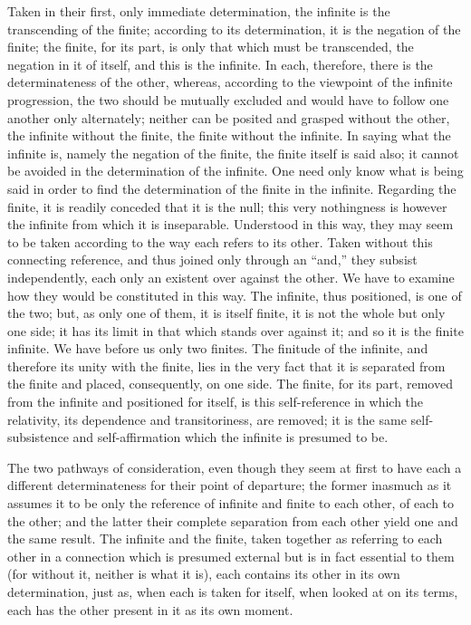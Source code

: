 Taken in their first, only immediate determination,
the infinite is the transcending of the finite;
according to its determination, it is the negation of the finite;
the finite, for its part, is only that which must be transcended,
the negation in it of itself, and this is the infinite.
In each, therefore, there is the determinateness of the other,
whereas, according to the viewpoint of the infinite progression,
the two should be mutually excluded
and would have to follow one another only alternately;
neither can be posited and grasped without the other,
the infinite without the finite, the finite without the infinite.
In saying what the infinite is, namely the negation of the finite,
the finite itself is said also;
it cannot be avoided in the determination of the infinite.
One need only know what is being said in order to
find the determination of the finite in the infinite.
Regarding the finite, it is readily conceded that it is the null;
this very nothingness is however the infinite
from which it is inseparable.
Understood in this way, they may seem to be taken
according to the way each refers to its other.
Taken without this connecting reference,
and thus joined only through an “and,”
they subsist independently,
each only an existent over against the other.
We have to examine how they would be constituted in this way.
The infinite, thus positioned, is one of the two;
but, as only one of them, it is itself finite,
it is not the whole but only one side;
it has its limit in that which stands over against it;
and so it is the finite infinite.
We have before us only two finites.
The finitude of the infinite,
and therefore its unity with the finite,
lies in the very fact that it is separated from the finite
and placed, consequently, on one side.
The finite, for its part, removed from the infinite
and positioned for itself, is this self-reference
in which the relativity, its dependence and transitoriness, are removed;
it is the same self-subsistence and self-affirmation
which the infinite is presumed to be.

The two pathways of consideration,
even though they seem at first to have
each a different determinateness for their point of departure;
the former inasmuch as it assumes it to be
only the reference of infinite and finite
to each other, of each to the other;
and the latter their complete separation from each other
yield one and the same result.
The infinite and the finite, taken together
as referring to each other in a connection
which is presumed external but is in fact essential to them
(for without it, neither is what it is),
each contains its other in its own determination,
just as, when each is taken for itself,
when looked at on its terms,
each has the other present in it
as its own moment.


